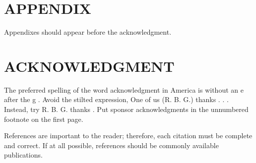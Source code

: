\documentclass[letterpaper, 10 pt, conference]{ieeeconf}  %
\begin{document}
\newpage
\section*{APPENDIX}

Appendixes should appear before the acknowledgment.

\section*{ACKNOWLEDGMENT}

The preferred spelling of the word  acknowledgment  in America is without an  e  after the  g . Avoid the stilted expression,  One of us (R. B. G.) thanks . . .   Instead, try  R. B. G. thanks . Put sponsor acknowledgments in the unnumbered footnote on the first page.



References are important to the reader; therefore, each citation must be complete and correct. If at all possible, references should be commonly available publications.



\end{document}
